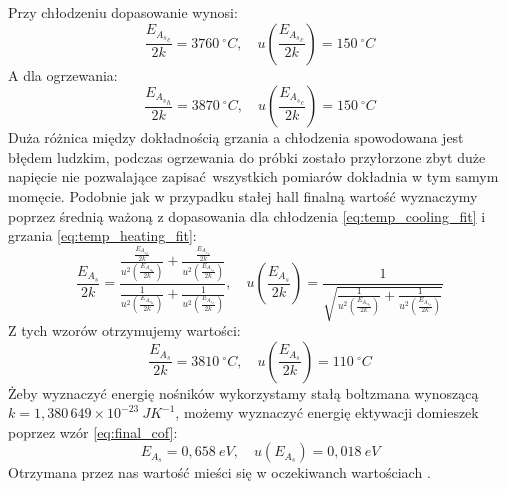 \documentclass[12pt]{article}
\begin{document}
Przy chłodzeniu dopasowanie wynosi:
\begin{equation}
    \frac{E_{{A_s}_c}}{2k} = 3760 \ ^{\circ}C, \quad u(\frac{E_{{A_s}_c}}{2k}) = 150 \ ^{\circ}C
    \label{eq:temp_cooling_fit}
\end{equation}
A dla ogrzewania:
\begin{equation}
    \frac{E_{{A_s}_h}}{2k} = 3870 \ ^{\circ}C, \quad u(\frac{E_{{A_s}_c}}{2k}) = 150 \ ^{\circ}C
    \label{eq:temp_heating_fit}
\end{equation}
Duża różnica między dokładnością grzania a chłodzenia spowodowana jest błędem ludzkim, podczas ogrzewania do próbki zostało przyłorzone zbyt duże napięcie nie pozwalające zapisać wszystkich pomiarów dokładnia w tym samym momęcie.
Podobnie jak w przypadku stałej hall finalną wartość wyznaczymy poprzez średnią ważoną z dopasowania dla chłodzenia \ref{eq:temp_cooling_fit} i grzania  \ref{eq:temp_heating_fit}:
\[
    \frac{E_{A_s}}{2k} = \frac{\frac{\frac{E_{{A_s}_h}}{2k}}{u^2(\frac{E_{{A_s}_h}}{2k})}+\frac{\frac{E_{{A_s}_c}}{2k}}{u^2(\frac{E_{{A_s}_c}}{2k})}}{\frac{1}{u^2(\frac{E_{{A_s}_h}}{2k})}+\frac{1}{u^2(\frac{E_{{A_s}_c}}{2k})}}, \quad u(\frac{E_{A_s}}{2k}) = \frac{1}{\sqrt{\frac{1}{u^2(\frac{E_{{A_s}_h}}{2k})}+\frac{1}{u^2(\frac{E_{{A_s}_c}}{2k})}}}
\]
Z tych wzorów otrzymujemy wartości:
\begin{equation}
    \frac{E_{A_s}}{2k} = 3810 \ ^{\circ}C , \quad u(\frac{E_{A_s}}{2k}) = 110 \ ^{\circ}C 
    \label{eq:final_cof}
\end{equation}
Żeby wyznaczyć energię nośników wykorzystamy stałą boltzmana \cite{boltzman} wynoszącą $k=1{,}380 \, 649 \times 10^{-23} \ JK^{-1}$, możemy wyznaczyć energię ektywacji domieszek poprzez wzór \ref{eq:final_cof}:
\begin{equation}
    E_{A_s} = 0{,}658 \ eV, \quad u(E_{A_s}) = 0{,}018 \ eV
\end{equation}
Otrzymana przez nas wartość mieści się w oczekiwanch wartościach \cite{band_gap}.
\end{document}
